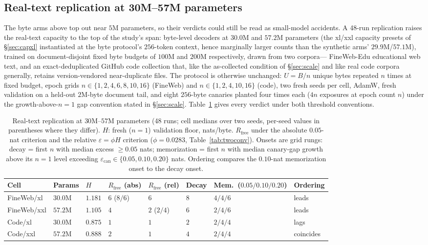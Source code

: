 \documentclass[11pt]{article}
\begin{document}
\subsection{Real-text replication at 30M--57M parameters}\label{sec:realscale}

The byte arms above top out near $5$M parameters, so their verdicts could still be
read as small-model accidents. A 48-run replication raises the real-text capacity
to the top of the study's span: byte-level decoders at $30.0$M and $57.2$M
parameters (the xl/xxl capacity presets of \S\ref{sec:capxl} instantiated at the
byte protocol's $256$-token context, hence marginally larger counts than the
synthetic arms' $29.9$M/$57.1$M), trained on document-disjoint
fixed byte budgets of $100$M and $200$M respectively, drawn from two corpora---
FineWeb-Edu educational web text, and an exact-deduplicated GitHub code collection
that, like the as-collected condition of \S\ref{sec:scale} and like real code
corpora generally, retains version-vendored near-duplicate files. The protocol is
otherwise unchanged: $U=B/n$ unique bytes repeated $n$ times at fixed budget, epoch
grids $n\in\{1,2,4,6,8,10,16\}$ (FineWeb) and $n\in\{1,2,4,10,16\}$ (code), two
fresh seeds per cell, AdamW, fresh validation on a held-out $2$M-byte document tail,
and eight $256$-byte canaries planted four times each ($4n$ exposures at epoch
count $n$) under the growth-above-$n{=}1$ gap convention stated in
\S\ref{sec:scale}. Table~\ref{tab:realscale} gives every verdict under both
threshold conventions.

\begin{table}[htbp]
\centering
\caption{Real-text replication at $30$M--$57$M parameters (48 runs; cell medians
over two seeds, per-seed values in parentheses where they differ). $H$: fresh
($n{=}1$) validation floor, nats/byte. $R_{\mathrm{free}}$ under the absolute
$0.05$-nat criterion and the relative $\varepsilon=\phi H$ criterion
($\phi=0.0283$, Table~\ref{tab:twoconv}). Onsets are grid rungs: decay = first
$n$ with median excess $\geq0.05$ nats; memorization = first $n$ with median
canary-gap growth above its $n{=}1$ level exceeding
$\varepsilon_{\mathrm{can}}\in\{0.05,0.10,0.20\}$ nats. Ordering compares the
$0.10$-nat memorization onset to the decay onset.}
\label{tab:realscale}
\scriptsize
\begin{tabular}{@{}llllllll@{}}
\toprule
Cell & Params & $H$ & $R_{\mathrm{free}}$ (abs) & $R_{\mathrm{free}}$ (rel) & Decay & Mem.\ ($0.05/0.10/0.20$) & Ordering \\
\midrule
FineWeb/xl  & $30.0$M & $1.181$ & $6$ ($8/6$) & $6$ & $8$ & $4/4/6$ & leads \\
FineWeb/xxl & $57.2$M & $1.105$ & $4$ & $2$ ($2/4$) & $6$ & $2/4/6$ & leads \\
Code/xl     & $30.0$M & $0.875$ & $1$ & $1$ & $2$ & $2/4/4$ & lags \\
Code/xxl    & $57.2$M & $0.888$ & $2$ & $1$ & $4$ & $2/4/4$ & coincides \\
\bottomrule
\end{tabular}
\end{table}
\end{document}
